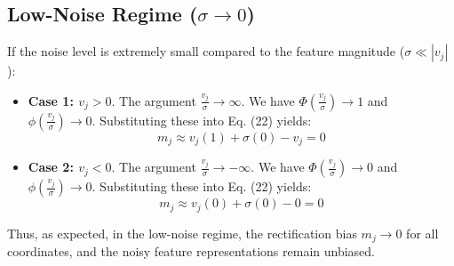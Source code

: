 \documentclass{article}
\theoremstyle{plain}
\theoremstyle{definition}
\theoremstyle{remark}
\begin{document}
\subsection{Low-Noise Regime ($\sigma \to 0$)}
If the noise level is extremely small compared to the feature magnitude ($\sigma \ll |v_j|$):
\begin{itemize}
    \item \textbf{Case 1: $v_j > 0$}. The argument $\frac{v_j}{\sigma} \to \infty$. We have $\Phi\left(\frac{v_j}{\sigma}\right) \to 1$ and $\phi\left(\frac{v_j}{\sigma}\right) \to 0$. Substituting these into Eq. (22) yields:
    \begin{equation}
        m_j \approx v_j (1) + \sigma (0) - v_j = 0
    \end{equation}
    \item \textbf{Case 2: $v_j < 0$}. The argument $\frac{v_j}{\sigma} \to -\infty$. We have $\Phi\left(\frac{v_j}{\sigma}\right) \to 0$ and $\phi\left(\frac{v_j}{\sigma}\right) \to 0$. Substituting these into Eq. (22) yields:
    \begin{equation}
        m_j \approx v_j (0) + \sigma (0) - 0 = 0
    \end{equation}
\end{itemize}
Thus, as expected, in the low-noise regime, the rectification bias $m_j \to 0$ for all coordinates, and the noisy feature representations remain unbiased.
\end{document}
